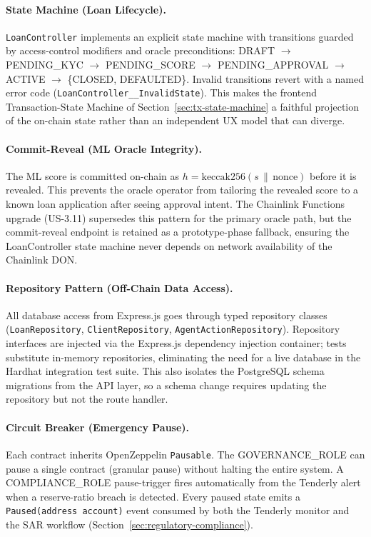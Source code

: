 \paragraph{State Machine (Loan Lifecycle).}
\texttt{LoanController} implements an explicit state machine with
transitions guarded by access-control modifiers and oracle preconditions:
DRAFT $\to$ PENDING\_KYC $\to$ PENDING\_SCORE $\to$ PENDING\_APPROVAL
$\to$ ACTIVE $\to$ \{CLOSED, DEFAULTED\}. Invalid transitions revert with
a named error code (\texttt{LoanController\_\_InvalidState}). This makes
the frontend Transaction-State Machine of Section~\ref{sec:tx-state-machine}
a faithful projection of the on-chain state rather than an independent UX
model that can diverge.

\paragraph{Commit-Reveal (ML Oracle Integrity).}
The ML score is committed on-chain as $h = \mathrm{keccak256}(s \,\|\,
\text{nonce})$ before it is revealed. This prevents the oracle operator from
tailoring the revealed score to a known loan application after seeing
approval intent. The Chainlink Functions upgrade (US-3.11) supersedes this
pattern for the primary oracle path, but the commit-reveal endpoint is
retained as a prototype-phase fallback, ensuring the LoanController state
machine never depends on network availability of the Chainlink DON.

\paragraph{Repository Pattern (Off-Chain Data Access).}
All database access from Express.js goes through typed repository classes
(\texttt{LoanRepository}, \texttt{ClientRepository},
\texttt{AgentActionRepository}). Repository interfaces are injected via the
Express.js dependency injection container; tests substitute in-memory
repositories, eliminating the need for a live database in the Hardhat
integration test suite. This also isolates the PostgreSQL schema migrations
from the API layer, so a schema change requires updating the repository but
not the route handler.

\paragraph{Circuit Breaker (Emergency Pause).}
Each contract inherits OpenZeppelin \texttt{Pausable}. The GOVERNANCE\_ROLE
can pause a single contract (granular pause) without halting the entire
system. A COMPLIANCE\_ROLE pause-trigger fires automatically from the
Tenderly alert when a reserve-ratio breach is detected. Every paused state
emits a \texttt{Paused(address account)} event consumed by both the
Tenderly monitor and the SAR workflow (Section~\ref{sec:regulatory-compliance}).

